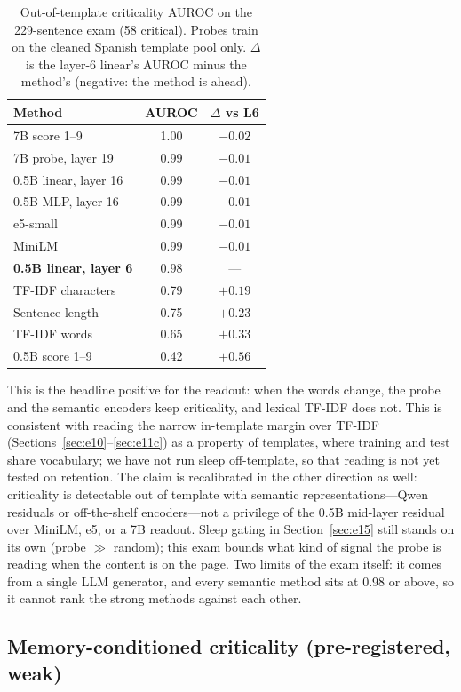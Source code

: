 \documentclass[11pt,a4paper]{article}
\begin{document}
\begin{table}[t]
\centering
\caption{Out-of-template criticality AUROC on the 229-sentence exam (58 critical). Probes train on the cleaned Spanish template pool only. $\Delta$ is the layer-6 linear's AUROC minus the method's (negative: the method is ahead).}
\label{tab:e16}
\small
\begin{tabular}{lcc}
\toprule
Method & AUROC & $\Delta$ vs L6 \\
\midrule
7B score 1--9 & 1.00 & $-0.02$ \\
7B probe, layer 19 & 0.99 & $-0.01$ \\
0.5B linear, layer 16 & 0.99 & $-0.01$ \\
0.5B MLP, layer 16 & 0.99 & $-0.01$ \\
e5-small & 0.99 & $-0.01$ \\
MiniLM & 0.99 & $-0.01$ \\
\textbf{0.5B linear, layer 6} & $\mathbf{0.98}$ & --- \\
TF-IDF characters & 0.79 & $+0.19$ \\
Sentence length & 0.75 & $+0.23$ \\
TF-IDF words & 0.65 & $+0.33$ \\
0.5B score 1--9 & 0.42 & $+0.56$ \\
\bottomrule
\end{tabular}
\end{table}

This is the headline positive for the readout: when the words change, the probe and the semantic encoders keep criticality, and lexical TF-IDF does not.
This is consistent with reading the narrow in-template margin over TF-IDF (Sections~\ref{sec:e10}--\ref{sec:e11c}) as a property of templates, where training and test share vocabulary; we have not run sleep off-template, so that reading is not yet tested on retention.
The claim is recalibrated in the other direction as well: criticality is detectable out of template with semantic representations---Qwen residuals or off-the-shelf encoders---not a privilege of the 0.5B mid-layer residual over MiniLM, e5, or a 7B readout.
Sleep gating in Section~\ref{sec:e15} still stands on its own (probe $\gg$ random); this exam bounds what kind of signal the probe is reading when the content is on the page.
Two limits of the exam itself: it comes from a single LLM generator, and every semantic method sits at 0.98 or above, so it cannot rank the strong methods against each other.

\subsection{Memory-conditioned criticality (pre-registered, weak)}
\label{sec:e17}
\end{document}
